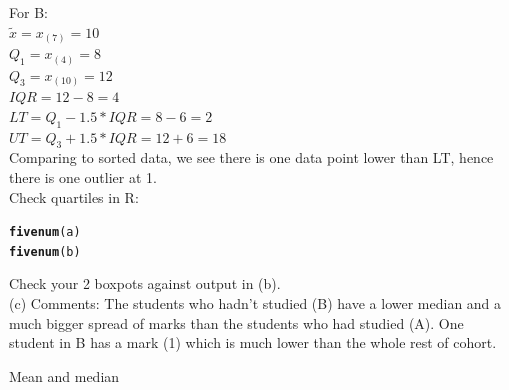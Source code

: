 \documentclass[bigtut]{tutorial}\usepackage[]{graphicx}\usepackage[]{color}
\makeatletter
\newcommand{\hlstd}[1]{\textcolor[rgb]{0.345,0.345,0.345}{#1}}%
\newcommand{\hlkwd}[1]{\textcolor[rgb]{0.737,0.353,0.396}{\textbf{#1}}}%
\newenvironment{kframe}{%
 \def\at@end@of@kframe{}%
 \ifinner\ifhmode%
  \def\at@end@of@kframe{\end{minipage}}%
  \begin{minipage}{\columnwidth}%
 \fi\fi%
 \def\FrameCommand##1{\hskip\@totalleftmargin \hskip-\fboxsep
 \colorbox{shadecolor}{##1}\hskip-\fboxsep
     \hskip-\linewidth \hskip-\@totalleftmargin \hskip\columnwidth}%
 \MakeFramed {\advance\hsize-\width
   \@totalleftmargin\z@ \linewidth\hsize
   \@setminipage}}%
 {\par\unskip\endMakeFramed%
 \at@end@of@kframe}
\newenvironment{knitrout}{}{} %
\makeatother
\begin{document}
\begin{tutorial}
\begin{questions}
\begin{solution}
For B: \\
$\tilde{x} = x_{(7)} = 10$ \\
$Q_{1} = x_{(4)} = 8 $ \\
$Q_{3} =  x_{(10)} = 12 $ \\
$IQR = 12-8 = 4$ \\
$LT = Q_{1} - 1.5*IQR = 8-6 = 2$ \\
$UT = Q_{3} + 1.5*IQR = 12+ 6 = 18$ \\

Comparing to sorted data, we see there is one data point lower than LT, hence there is one outlier at 1.\\

Check quartiles in R:
\begin{knitrout}
\color{fgcolor}\begin{kframe}
\begin{alltt}
\hlkwd{fivenum}\hlstd{(a)}
\hlkwd{fivenum}\hlstd{(b)}
\end{alltt}
\end{kframe}
\end{knitrout}

Check your 2 boxpots against output in (b).  \\

(c) 
Comments: The students who hadn't studied (B) have a lower median and a much bigger spread of marks than the students who had studied (A).  One student in B has a mark (1) which is much lower than the whole rest of cohort.

\end{solution}



\question Mean and median \\

		

\end{questions}
\end{tutorial}
\end{document}
